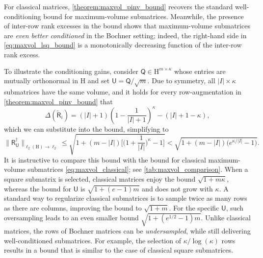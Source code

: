 \documentclass[onefignum,onetabnum]{siamart250211}
\renewenvironment{equation*}{\[}{\]\ignorespacesafterend}
\newcommand{\Hilb}{\mathrm{H}}
\newcommand{\Batrix}[1]{\bm{\Matrix{#1}}}
\newcommand{\Matrix}[1]{\mathsf{#1}}
\newcommand{\pinv}{\dagger}
\newcommand{\Index}[1]{{#1}}
\newcommand{\Norm}[3][]{#1\| #2 #1\|_{\mathrm{#3}}}
\begin{document}
For classical matrices, \cref{theorem:maxvol_pinv_bound} recovers the standard well-conditioning bound for maximum-volume submatrices.
Meanwhile, the presence of inter-row rank excesses in the bound shows that maximum-volume submatrices are \emph{even better conditioned} in the Bochner setting; indeed, the right-hand side in \cref{eq:maxvol_lsq_bound} is a monotonically decreasing function of the inter-row rank excess.

To illustrate the conditioning gains, consider $\Batrix{Q} \in \Hilb^{m \times \kappa}$ whose entries are mutually orthonormal in $\Hilb$ and set $\Batrix{U} = \Batrix{Q} / \sqrt{m}$.
Due to symmetry, all $|\Index{I}| \times \kappa$ submatrices have the same volume, and it holds for every row-augmentation in \cref{theorem:maxvol_pinv_bound} that
\begin{equation*}
    \Delta(\tilde{\Batrix{R}}_{i}) = (|\Index{I}| + 1) \left( 1 - \frac{1}{|\Index{I}| + 1} \right)^{\kappa} - (|\Index{I}| + 1 - \kappa),
\end{equation*}
which we can substitute into the bound, simplifying to
\begin{equation*}
     \Norm{\Batrix{R}_{\Batrix{U}}^\pinv}{\ell_2(\Hilb) \to \ell_2} \leq \sqrt{1 + (m - |\Index{I}|) \Big[ \Big(1 + \frac{1}{|\Index{I}|}\Big)^\kappa - 1 \Big]} < \sqrt{1 + (m - |\Index{I}|) \big( e^{\kappa / |\Index{I}|} - 1 \big)}.
\end{equation*}
It is instructive to compare this bound with the bound for classical maximum-volume submatrices \cref{eq:maxvol_classical}; see \cref{tab:maxvol_comparison}.
When a square submatrix is selected, classical matrices enjoy the bound $\sqrt{1 + m \kappa}$, whereas the bound for $\Batrix{U}$ is $\sqrt{1 + (e-1)m}$ and does not grow with $\kappa$.
A standard way to regularize classical submatrices is to sample twice as many rows as there are columns, improving the bound to $\sqrt{1 + m}$.
For the specific $\Batrix{U}$, such oversampling leads to an even smaller bound $\sqrt{1 + (e^{1/2}-1)m}$.
Unlike classical matrices, the rows of Bochner matrices can be \emph{undersampled}, while still delivering well-conditioned submatrices.
For example, the selection of $\kappa / \log(\kappa)$ rows results in a bound that is similar to the case of classical square submatrices.
\end{document}
